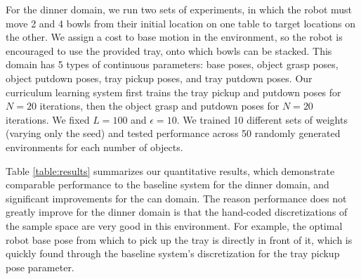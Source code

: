 For the dinner domain, we run two sets of experiments, in which the robot must move 2 and 4
bowls from their initial location on one table to target locations on the other. We assign a cost to
base motion in the environment, so the robot is encouraged to use the provided tray, onto which bowls can be stacked.
This domain has 5 types of continuous parameters: base poses, object grasp poses, object putdown poses, tray pickup
poses, and tray putdown poses. Our curriculum learning system first trains the tray pickup and putdown poses for
$N = 20$ iterations, then the object grasp and putdown poses for $N = 20$ iterations. We fixed $L = 100$ and $\epsilon = 10$.
We trained 10 different sets of weights (varying only the seed) and tested performance across 50 randomly generated
environments for each number of objects.

Table \ref{table:results} summarizes our quantitative results, which demonstrate
comparable performance to the baseline system for the dinner domain, and significant improvements for
the can domain. The reason performance does not greatly improve for the dinner domain is that the
hand-coded discretizations of the sample space are very good in this environment. For example, the optimal
robot base pose from which to pick up the tray is directly in front of it, which is quickly found through
the baseline system's discretization for the tray pickup pose parameter.